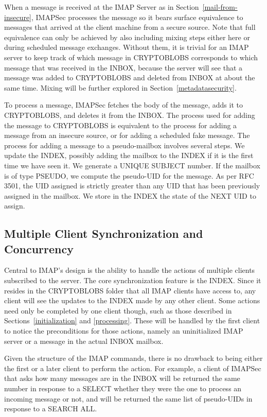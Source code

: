 \documentclass[pageno]{jpaper}
\newcommand{\project}{IMAPSec }
\begin{document}
When a message is received at the IMAP Server as in Section~\ref{mail-from-insecure}, \project processes the message so it bears surface equivalence to messages that arrived at the client machine from a secure source. Note that full equivalence can only be achieved by also including mixing steps either here or during scheduled message exchanges. Without them, it is trivial for an IMAP server to keep track of which message in CRYPTOBLOBS corresponds to which message that was received in the INBOX, because the server will see that a message was added to CRYPTOBLOBS and deleted from INBOX at about the same time. Mixing will be further explored in Section~\ref{metadatasecurity}.

To process a message, \project fetches the body of the message, adds it to CRYPTOBLOBS, and deletes it from the INBOX. The process used for adding the message to CRYPTOBLOBS is equivalent to the process for adding a message from an insecure source, or for adding a scheduled fake message. The process for adding a message to a pseudo-mailbox involves several steps. We update the INDEX, possibly adding the mailbox to the INDEX if it is the first time we have seen it. We generate a UNIQUE SUBJECT number. If the mailbox is of type PSEUDO, we compute the pseudo-UID for the message. As per RFC 3501, the UID assigned is strictly greater than any UID that has been previously assigned in the mailbox. We store in the INDEX the state of the NEXT UID to assign.


\subsection{Multiple Client Synchronization and Concurrency}
Central to IMAP's design is the ability to handle the actions of multiple clients subscribed to the server. The core synchronization feature is the INDEX. Since it resides in the CRYPTOBLOBS folder that all IMAP clients have access to, any client will see the updates to the INDEX made by any other client. Some actions need only be completed by one client though, such as those described in Sections~\ref{initialization} and \ref{processing}. These will be handled by the first client to notice the preconditions for those actions, namely an uninitialized IMAP server or a message in the actual INBOX mailbox.

Given the structure of the IMAP commands, there is no drawback to being either the first or a later client to perform the action. For example, a client of \project that asks how many messages are in the INBOX will be returned the same number in response to a SELECT whether they were the one to process an incoming message or not, and will be returned the same list of pseudo-UIDs in response to a SEARCH ALL.
\end{document}
